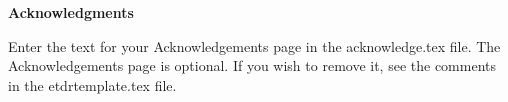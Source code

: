 
\vspace*{0.9cm}
\begin{center}
{\bf \Huge Acknowledgments}
\end{center}

\setlength{\baselineskip}{0.8cm}



Enter the text for your Acknowledgements page in the acknowledge.tex
file. The Acknowledgements page is optional.  If you wish to remove
it, see the comments in the etdrtemplate.tex file.

